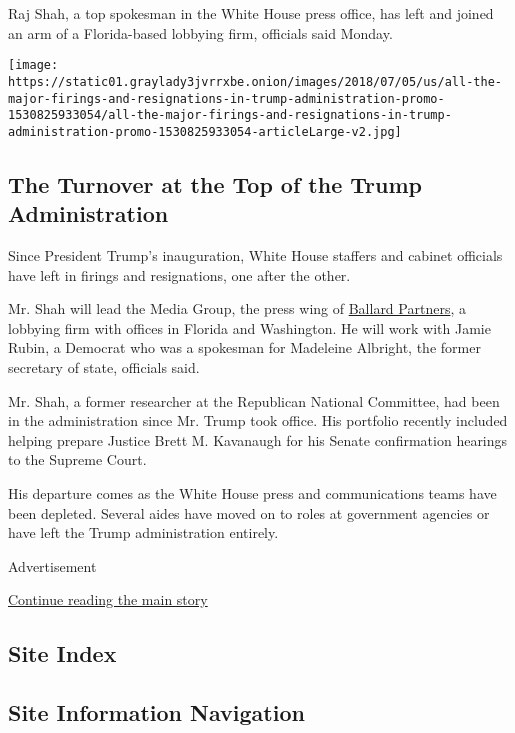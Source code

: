 Raj Shah, a top spokesman in the White House press office, has left and
joined an arm of a Florida-based lobbying firm, officials said Monday.

\href{https://www.nytimes3xbfgragh.onion/interactive/2018/03/16/us/politics/all-the-major-firings-and-resignations-in-trump-administration.html}{}

\texttt{[image: https://static01.graylady3jvrrxbe.onion/images/2018/07/05/us/all-the-major-firings-and-resignations-in-trump-administration-promo-1530825933054/all-the-major-firings-and-resignations-in-trump-administration-promo-1530825933054-articleLarge-v2.jpg]}

\hypertarget{the-turnover-at-the-top-of-the-trump-administration}{%
\subsection{The Turnover at the Top of the Trump
Administration}\label{the-turnover-at-the-top-of-the-trump-administration}}

Since President Trump's inauguration, White House staffers and cabinet
officials have left in firings and resignations, one after the other.

Mr. Shah will lead the Media Group, the press wing of
\href{https://ballardpartners.com/}{Ballard Partners}, a lobbying firm
with offices in Florida and Washington. He will work with Jamie Rubin, a
Democrat who was a spokesman for Madeleine Albright, the former
secretary of state, officials said.

Mr. Shah, a former researcher at the Republican National Committee, had
been in the administration since Mr. Trump took office. His portfolio
recently included helping prepare Justice Brett M. Kavanaugh for his
Senate confirmation hearings to the Supreme Court.

His departure comes as the White House press and communications teams
have been depleted. Several aides have moved on to roles at government
agencies or have left the Trump administration entirely.

Advertisement

\protect\hyperlink{after-bottom}{Continue reading the main story}

\hypertarget{site-index}{%
\subsection{Site Index}\label{site-index}}

\hypertarget{site-information-navigation}{%
\subsection{Site Information
Navigation}\label{site-information-navigation}}


